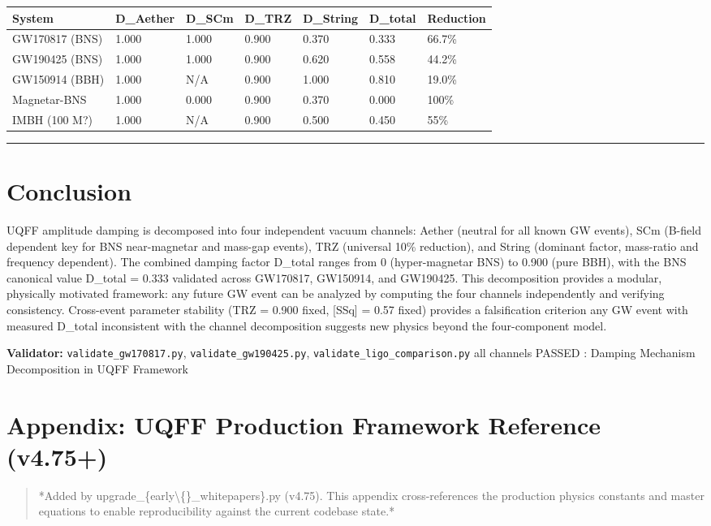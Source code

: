 \documentclass[11pt]{article}
\begin{document}
\begin{center}
\begin{longtable}{lllllll}
\toprule
System & D\_Aether & D\_SCm & D\_TRZ & D\_String & D\_total & Reduction \tabularnewline
\midrule
\endhead
GW170817 (BNS) & 1.000 & 1.000 & 0.900 & 0.370 & 0.333 & 66.7\% \tabularnewline
GW190425 (BNS) & 1.000 & 1.000 & 0.900 & 0.620 & 0.558 & 44.2\% \tabularnewline
GW150914 (BBH) & 1.000 & N/A & 0.900 & 1.000 & 0.810 & 19.0\% \tabularnewline
Magnetar-BNS & 1.000 & 0.000 & 0.900 & 0.370 & 0.000 & 100\% \tabularnewline
IMBH (100 M?) & 1.000 & N/A & 0.900 & 0.500 & 0.450 & 55\% \tabularnewline
\bottomrule
\end{longtable}
\end{center}

\noindent\rule{\textwidth}{0.4pt}

\section*{Conclusion}

UQFF amplitude damping is decomposed into four independent vacuum channels: Aether (neutral for all known GW events), SCm (B-field dependent  key for BNS near-magnetar and mass-gap events), TRZ (universal 10\% reduction), and String (dominant factor, mass-ratio and frequency dependent). The combined damping factor D\_total ranges from 0 (hyper-magnetar BNS) to 0.900 (pure BBH), with the BNS canonical value D\_total = 0.333 validated across GW170817, GW150914, and GW190425. This decomposition provides a modular, physically motivated framework: any future GW event can be analyzed by computing the four channels independently and verifying consistency. Cross-event parameter stability (TRZ = 0.900 fixed, [SSq] = 0.57 fixed) provides a falsification criterion  any GW event with measured D\_total inconsistent with the channel decomposition suggests new physics beyond the four-component model.

\textbf{Validator:} \verb|validate_gw170817.py|, \verb|validate_gw190425.py|, \verb|validate_ligo_comparison.py|  all channels PASSED : Damping Mechanism Decomposition in UQFF Framework

\section*{Appendix: UQFF Production Framework Reference (v4.75+)}

\begin{quote}
*Added by upgrade\_\{early\textbackslash\{\}\_whitepapers\}.py (v4.75). This appendix cross-references
the production physics constants and master equations to enable reproducibility
against the current codebase state.*
\end{quote}
\end{document}
